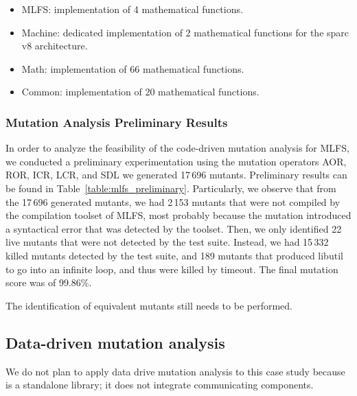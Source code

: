 \begin{itemize}
	\item MLFS: implementation of 4 mathematical functions.
	\item Machine: dedicated implementation of 2 mathematical functions for the sparc v8 architecture.
	\item Math: implementation of 66 mathematical functions.
	\item Common: implementation of 20 mathematical functions.
\end{itemize}

\subsubsection{Mutation Analysis Preliminary Results}



In order to analyze the feasibility of the code-driven mutation analysis for MLFS, we conducted a preliminary experimentation using the mutation operators AOR, ROR, ICR, LCR, and SDL we generated 17\,696 mutants. Preliminary results can be found in Table~\ref{table:mlfs_preliminary}.
Particularly, we observe that from the 17\,696 generated mutants, we had 2\,153 mutants that were not compiled by the compilation toolset of MLFS, most probably because the mutation introduced a syntactical error that was detected by the toolset.
Then, we only identified 22 live mutants that were not detected by the test suite. Instead, we had 15\,332 killed mutants detected by the test suite, and 189 mutants that produced libutil to go into an infinite loop, and thus were killed by timeout. The final mutation score was of 99.86\%.

The identification of equivalent mutants still needs to be performed.


\subsection{Data-driven mutation analysis}

We do not plan to apply data drive mutation analysis to this case study because is a standalone library; it does not integrate communicating components.



